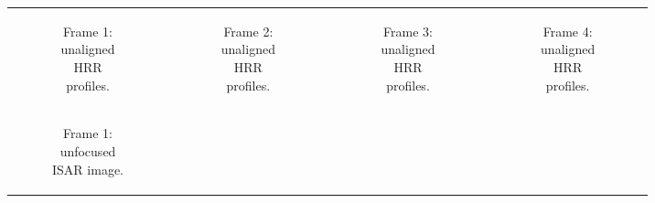 \documentclass[class=report,11pt,crop=false]{standalone}
\begin{document}
    \begin{figure}[h]
        \begin{minipage}{0.9\linewidth}
            \begin{figure}
                \begin{tabular}{@{}cccc@{}}
                    \begin{subfigure}{0.25\linewidth}
                        \centering
                        \resizebox{\linewidth}{!}{}
                        \caption{Frame 1: unaligned HRR profiles. \label{subfig:measured_data_frames_HRRP_2464}}
                    \end{subfigure}
                    &
                    \begin{subfigure}{0.25\linewidth}
                        \centering
                        \resizebox{\linewidth}{!}{}
                        \caption{Frame 2: unaligned HRR profiles.}
                    \end{subfigure}
                    &
                    \begin{subfigure}{0.25\linewidth}
                        \centering
                        \resizebox{\linewidth}{!}{}
                        \caption{Frame 3: unaligned HRR profiles.}
                    \end{subfigure}
                    &
                    \begin{subfigure}{0.25\linewidth}
                        \centering
                        \resizebox{\linewidth}{!}{}
                        \caption{Frame 4: unaligned HRR profiles. \label{subfig:measured_data_frames_HRRP_4189}}
                    \end{subfigure}
                    \\
                    \begin{subfigure}{0.25\linewidth}
                        \centering
                        \resizebox{\linewidth}{!}{}
                        \caption{Frame 1: unfocused ISAR image.}
                    \end{subfigure}
                    &
                    \begin{subfigure}{0.25\linewidth}
                        \centering

\end{subfigure}
\end{tabular}
\end{figure}
\end{minipage}
\end{figure}
\end{document}
